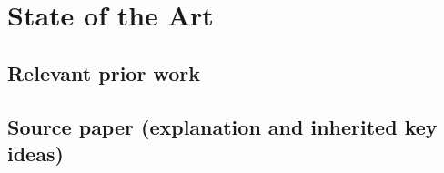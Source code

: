 \chapter{State of the Art}\label{chap:state-of-the-art}

\section{Relevant prior work}\label{sec:prior-work}

\section{Source paper (explanation and inherited key ideas)}\label{sec:source-paper}

